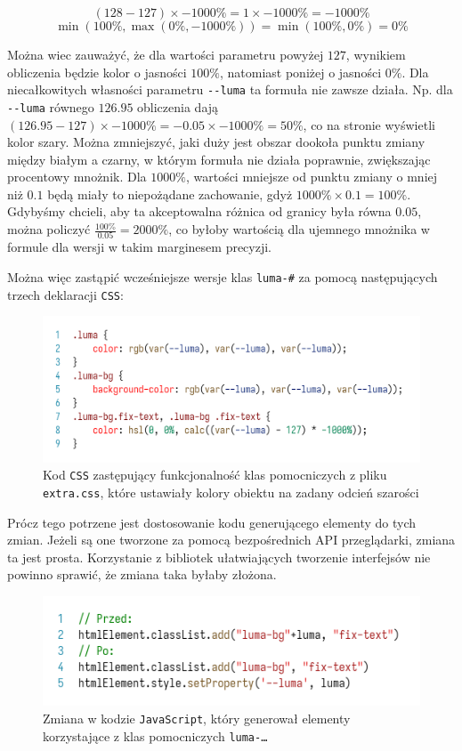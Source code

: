 \documentclass[licencjacka]{pracadypl}
\begin{document}
\[
  \left(128-127\right) \times -1000\% = 1 \times -1000\% = -1000\%
\]
\[
  \min\left(100\%, \max\left(0\%, -1000\%\right)\right) = \min\left(100\%, 0\%\right) = 0\%
\]

Można wiec zauważyć, że dla wartości parametru powyżej $127$, wynikiem obliczenia będzie kolor o jasności $100\%$, natomiast poniżej o jasności $0\%$. Dla niecałkowitych własności parametru \texttt{-\.-luma} ta formuła nie zawsze działa. Np. dla \texttt{-\.-luma} równego $126.95$ obliczenia dają $\left(126.95-127\right)\times-1000\% = -0.05 \times -1000\% = 50\%$, co na stronie wyświetli kolor szary. Można zmniejszyć, jaki duży jest obszar dookoła punktu zmiany między białym a czarny, w którym formuła nie działa poprawnie, zwiększając procentowy mnożnik. Dla $1000\%$, wartości mniejsze od punktu zmiany o mniej niż $0.1$ będą miały to niepożądane zachowanie, gdyż $1000\%\times0.1 = 100\%$. Gdybyśmy chcieli, aby ta akceptowalna różnica od granicy była równa $0.05$, można policzyć $\frac{100\%}{0.05} = 2000\%$, co byłoby wartością dla ujemnego mnożnika w formule dla wersji w takim marginesem precyzji.

Można więc zastąpić wcześniejsze wersje klas \texttt{luma-\#} za pomocą następujących trzech deklaracji \texttt{CSS}:

\begin{figure}[H]
  \centering
  \includegraphics[width=\linewidth]{images/code-css-luma-all.png}
  \caption{Kod \texttt{CSS} zastępujący funkcjonalność klas pomocniczych z pliku \texttt{extra.css}, które ustawiały kolory obiektu na zadany odcień szarości}
  \label{fig:css-css-luma-all}
\end{figure}

Prócz tego potrzene jest dostosowanie kodu generującego elementy do tych zmian. Jeżeli są one tworzone za pomocą bezpośrednich API przeglądarki, zmiana ta jest prosta. Korzystanie z bibliotek ułatwiających tworzenie interfejsów nie powinno sprawić, że zmiana taka byłaby złożona.

\begin{figure}[H]
  \centering
  \includegraphics[width=\linewidth]{images/code-js-luma-adjust.png}
  \caption{Zmiana w kodzie \texttt{JavaScript}, który generował elementy korzystające z klas pomocniczych \texttt{luma-\dots}}
  \label{fig:code-js-luma-adjust}
\end{figure}
\end{document}
